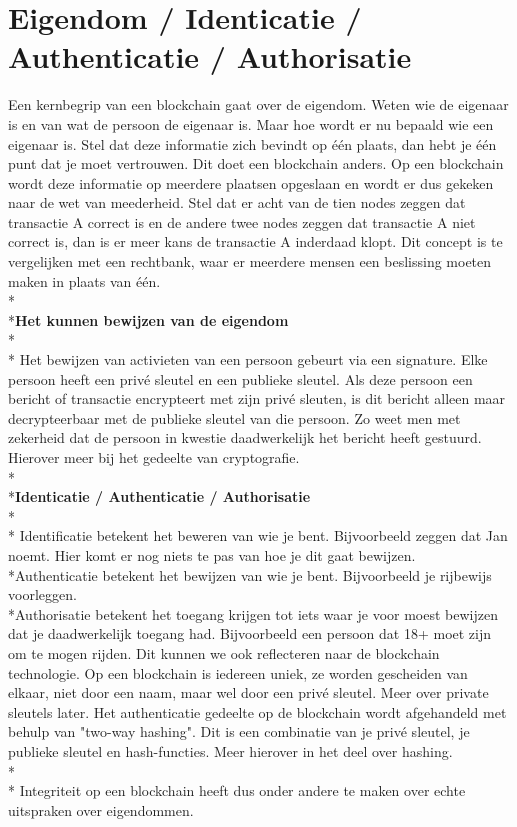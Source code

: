 \documentclass[fleqn,a4paper,12pt]{book}
\begin{document}
\section{Eigendom / Identicatie / Authenticatie / Authorisatie}
Een kernbegrip van een blockchain gaat over de eigendom. Weten wie de eigenaar is en van wat de persoon de eigenaar is. Maar hoe wordt er nu bepaald wie een eigenaar is. Stel dat deze informatie zich bevindt op één plaats, dan hebt je één punt dat je moet vertrouwen. Dit doet een blockchain anders. Op een blockchain wordt deze informatie op meerdere plaatsen opgeslaan en wordt er dus gekeken naar de wet van meederheid. Stel dat er acht van de tien nodes zeggen dat transactie A correct is en de andere twee nodes zeggen dat transactie A niet correct is, dan is er meer kans de transactie A inderdaad klopt. Dit concept is te vergelijken met een rechtbank, waar er meerdere mensen een beslissing moeten maken in plaats van één.
\\*\\*\textbf{Het kunnen bewijzen van de eigendom}\\*\\*
Het bewijzen van activieten van een persoon gebeurt via een signature. Elke persoon heeft een privé sleutel en een publieke sleutel. Als deze persoon een bericht of transactie encrypteert met zijn privé sleuten, is dit bericht alleen maar decrypteerbaar met de publieke sleutel van die persoon. Zo weet men met zekerheid dat de persoon in kwestie daadwerkelijk het bericht heeft gestuurd. Hierover meer bij het gedeelte van cryptografie.
\\*\\*\textbf{Identicatie / Authenticatie / Authorisatie}\\*\\*
Identificatie betekent het beweren van wie je bent. Bijvoorbeeld zeggen dat Jan noemt. Hier komt er nog niets te pas van hoe je dit gaat bewijzen.
\\*Authenticatie betekent het bewijzen van wie je bent. Bijvoorbeeld je rijbewijs voorleggen.
\\*Authorisatie betekent het toegang krijgen tot iets waar je voor moest bewijzen dat je daadwerkelijk toegang had. Bijvoorbeeld een persoon dat 18+ moet zijn om te mogen rijden. Dit kunnen we ook reflecteren naar de blockchain technologie. Op een blockchain is iedereen uniek, ze worden gescheiden van elkaar, niet door een naam, maar wel door een privé sleutel. Meer over private sleutels later. Het authenticatie gedeelte op de blockchain wordt afgehandeld met behulp van "two-way hashing". Dit is een combinatie van je privé sleutel, je publieke sleutel en hash-functies. Meer hierover in het deel over hashing.\\*\\*
Integriteit op een blockchain heeft dus onder andere te maken over echte uitspraken over eigendommen.
\end{document}
